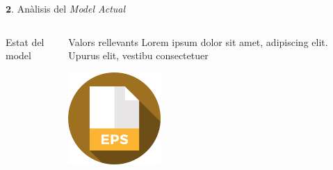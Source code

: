 \documentclass[twocolumn]{beamer}
\begin{document}
\begin{frame}{$\mathbf 2.$ Anàlisis del \textit{Model Actual}}
\begin{columns}[t]
	\begin{column}{.5\textwidth}
		\begin{block}{Estat del model}
		
		\end{block}
	\end{column}
	\begin{column}{.5\textwidth}
		\begin{block}{Valors rellevants}
			Lorem ipsum dolor sit amet,
			adipiscing elit. Upurus elit, vestibu
			consectetuer 
		\end{block}
		\includegraphics[width=3.5cm]{eps}
	\end{column}
\end{columns}
\end{frame}
\end{document}
